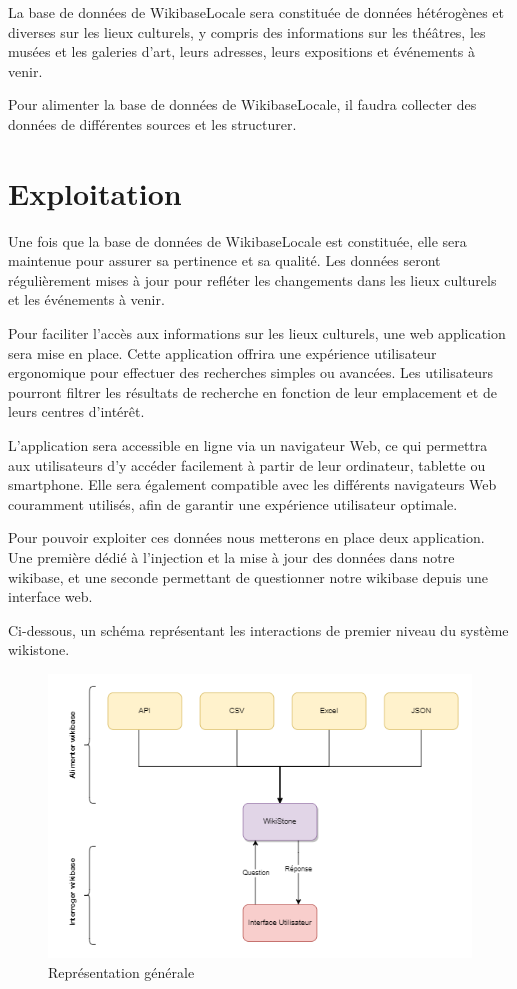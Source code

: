 \documentclass[a4paper, 12pt]{article}
\begin{document}
La base de données de WikibaseLocale sera constituée de données hétérogènes et diverses sur les lieux culturels, y compris des informations sur les théâtres, les musées et les galeries d'art, leurs adresses, leurs expositions et événements à venir.

Pour alimenter la base de données de WikibaseLocale, il faudra collecter des données de différentes sources et les structurer.

\section{Exploitation}

Une fois que la base de données de WikibaseLocale est constituée, elle sera maintenue pour assurer sa pertinence et sa qualité. Les données seront régulièrement mises à jour pour refléter les changements dans les lieux culturels et les événements à venir.

Pour faciliter l'accès aux informations sur les lieux culturels, une web application sera mise en place. Cette application offrira une expérience utilisateur ergonomique pour effectuer des recherches simples ou avancées. Les utilisateurs pourront filtrer les résultats de recherche en fonction de leur emplacement et de leurs centres d'intérêt.

L'application sera accessible en ligne via un navigateur Web, ce qui permettra aux utilisateurs d'y accéder facilement à partir de leur ordinateur, tablette ou smartphone. Elle sera également compatible avec les différents navigateurs Web couramment utilisés, afin de garantir une expérience utilisateur optimale.

Pour pouvoir exploiter ces données nous metterons en place deux application. Une première dédié à l'injection et la mise à jour des données dans notre wikibase, et une seconde permettant de questionner notre wikibase depuis une interface web.

Ci-dessous, un schéma représentant les interactions de premier niveau du système wikistone.

\begin{figure}[h]
    \centering
    \includegraphics[scale=0.75]{schema-general.png}
    \caption{Représentation générale}
    \label{fig:my_label}
\end{figure}
\end{document}
